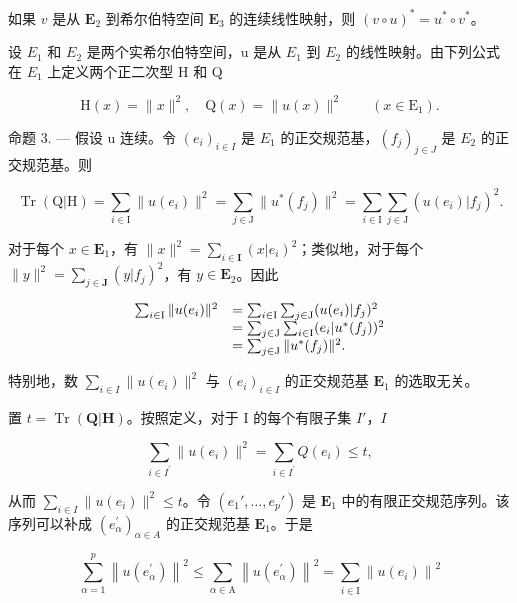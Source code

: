 如果 \(v\) 是从 \(\mathbf{E}_2\) 到希尔伯特空间 \(\mathbf{E}_3\) 的连续线性映射，则 \((v \circ u)^* = u^* \circ v^*\)。

设 \(E_{1}\) 和 \(E_{2}\) 是两个实希尔伯特空间，u 是从 \(E_{1}\) 到 \(E_{2}\) 的线性映射。由下列公式在 \(E_{1}\) 上定义两个正二次型 H 和 Q

\[
\mathrm{H} (x) = \| x \| ^ {2}, \quad \mathrm{Q} (x) = \| u (x) \| ^ {2} \qquad (x \in \mathrm{E} _ {1}).
\]

命题 3. --- 假设 u 连续。令 \((e_{i})_{i\in I}\) 是 \(E_{1}\) 的正交规范基，\((f_{j})_{j\in J}\) 是 \(E_{2}\) 的正交规范基。则

\[
\operatorname{Tr} (\mathrm{Q} | \mathrm{H}) = \sum_ {i \in \mathrm{I}} \| u (e _ {i}) \| ^ {2} = \sum_ {j \in \mathrm{J}} \| u ^ {*} (f _ {j}) \| ^ {2} = \sum_ {i \in \mathrm{I}} \sum_ {j \in \mathrm{J}} (u (e _ {i}) | f _ {j}) ^ {2}.
\]

对于每个 \(x \in \mathbf{E}_1\)，有 \(\|x\|^2 = \sum_{i \in \mathbf{I}} (x|e_i)^2\)；类似地，对于每个 \(\|y\|^2 = \sum_{j \in \mathbf{J}} (y|f_j)^2\)，有 \(y \in \mathbf{E}_2\)。因此

\[
\begin{array}{r l} \sum_ {i \in \mathrm{I}} \| u (e _ {i}) \| ^ {2} & = \sum_ {i \in \mathrm{I}} \sum_ {j \in \mathrm{J}} (u (e _ {i}) | f _ {j}) ^ {2} \\ & = \sum_ {j \in \mathrm{J}} \sum_ {i \in \mathrm{I}} (e _ {i} | u ^ {*} (f _ {j})) ^ {2} \\ & = \sum_ {j \in \mathrm{J}} \| u ^ {*} (f _ {j}) \| ^ {2}. \end{array}
\]

特别地，数 \(\sum_{i\in I}\| u(e_i)\|^2\) 与 \((e_i)_{i\in I}\) 的正交规范基 \(\mathbf{E}_1\) 的选取无关。

置 \(t = \operatorname{Tr}(\mathbf{Q}|\mathbf{H})\)。按照定义，对于 I 的每个有限子集 \(I'\)，\(I\)

\[
\sum_ {i \in I ^ {\prime}} \| u (e _ {i}) \| ^ {2} = \sum_ {i \in I ^ {\prime}} Q (e _ {i}) \leqslant t,
\]

从而 \(\sum_{i\in I}\| u(e_i)\|^2\leqslant t\)。令 \((e_1',\dots ,e_p')\) 是 \(\mathbf{E}_1\) 中的有限正交规范序列。该序列可以补成 \((e_{\alpha}^{\prime})_{\alpha \in A}\) 的正交规范基 \(\mathbf{E}_1\)。于是

\[
\sum_ {\alpha = 1} ^ {p} \left\| u (e _ {\alpha} ^ {\prime}) \right\| ^ {2} \leqslant \sum_ {\alpha \in \mathrm{A}} \left\| u (e _ {\alpha} ^ {\prime}) \right\| ^ {2} = \sum_ {i \in \mathrm{I}} \left\| u (e _ {i}) \right\| ^ {2}
\]

